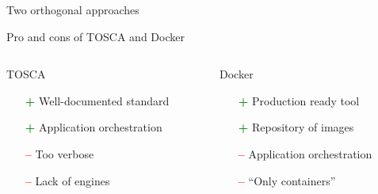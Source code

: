 \documentclass{beamer}
\begin{document}
\begin{frame}{Two orthogonal approaches}
  \end{frame}

  \begin{frame}{Pro and cons of TOSCA and Docker}
    \begin{columns}[T]
      \begin{column}{.5\textwidth}
        \centering
          {\Large TOSCA}
          \medskip
          \begin{itemize}
            \item[\textcolor{green}{\textbf{+}}] Well-documented standard
            \item[\textcolor{green}{\textbf{+}}] Application orchestration\pause\medskip
            \item[\textcolor{red}{\textbf{--}}] Too verbose
            \item[\textcolor{red}{\textbf{--}}] Lack of engines\pause
          \end{itemize}
      \end{column}
      \begin{column}{.5\textwidth}
        \centering
        {\Large Docker}
        \medskip
        \begin{itemize}
          \item[\textcolor{green}{\textbf{+}}] Production ready tool
          \item[\textcolor{green}{\textbf{+}}] Repository of images\pause\medskip
          \item[\textcolor{red}{\textbf{--}}] Application orchestration
          \item[\textcolor{red}{\textbf{--}}] ``Only containers''
        \end{itemize}
      \end{column}
    \end{columns}
  \end{frame}
\end{document}
